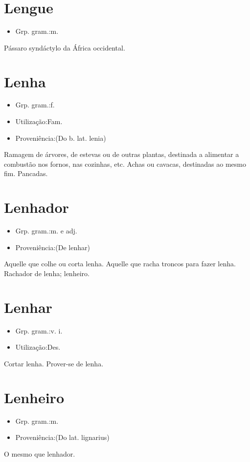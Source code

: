 \section{Lengue}
\begin{itemize}
\item {Grp. gram.:m.}
\end{itemize}
Pássaro syndáctylo da África occidental.
\section{Lenha}
\begin{itemize}
\item {Grp. gram.:f.}
\end{itemize}
\begin{itemize}
\item {Utilização:Fam.}
\end{itemize}
\begin{itemize}
\item {Proveniência:(Do b. lat. \textunderscore lenia\textunderscore )}
\end{itemize}
Ramagem de árvores, de estevas ou de outras plantas, destinada a alimentar a combustão nos fornos, nas cozinhas, etc.
Achas ou cavacas, destinadas ao mesmo fim.
Pancadas.
\section{Lenhador}
\begin{itemize}
\item {Grp. gram.:m.  e  adj.}
\end{itemize}
\begin{itemize}
\item {Proveniência:(De \textunderscore lenhar\textunderscore )}
\end{itemize}
Aquelle que colhe ou corta lenha.
Aquelle que racha troncos para fazer lenha.
Rachador de lenha; lenheiro.
\section{Lenhar}
\begin{itemize}
\item {Grp. gram.:v. i.}
\end{itemize}
\begin{itemize}
\item {Utilização:Des.}
\end{itemize}
Cortar lenha.
Prover-se de lenha.
\section{Lenheiro}
\begin{itemize}
\item {Grp. gram.:m.}
\end{itemize}
\begin{itemize}
\item {Proveniência:(Do lat. \textunderscore lignarius\textunderscore )}
\end{itemize}
O mesmo que \textunderscore lenhador\textunderscore .
